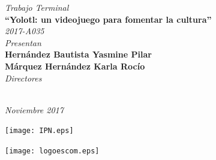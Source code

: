 \begin{titlepage}
{\begin{center}
	    {\fontsize{14}{20} \textit{Trabajo Terminal}}\vspace{1cm}\\
	    {\fontsize{16}{20} \textbf{``Yolotl: un videojuego para fomentar la cultura''}}\vspace{0.5cm}\\
	    {\fontsize{14}{20} \textit{2017-A035}}\vspace{1.5cm}\\
	    {\fontsize{14}{20} \textit{Presentan}}\\
	    {\fontsize{14}{20} \textbf{Hernández Bautista Yasmine Pilar}}\vspace{1cm}\\
	   	{\fontsize{14}{20} \textbf{Márquez Hernández Karla Rocío}}\vspace{1.5cm}\\
	   \fontsize{14}{20} \textit{Directores}\\

	    
	    
{\fboxrule=0pt \fboxsep=6pt	    
}\\[3.5cm]
\end{center}
	    
	    \hfill  \fontsize{12}{20} \textit{Noviembre 2017}
	    
	}
\end{titlepage}

\thispagestyle{empty}

\parbox{18cm}{
\parbox{1.5cm}{
\texttt{[image: IPN.eps]}
}
\parbox{12cm}{
}
\parbox{1.5cm}{
\texttt{[image: logoescom.eps]}
}\vspace{1.5cm} 
}

